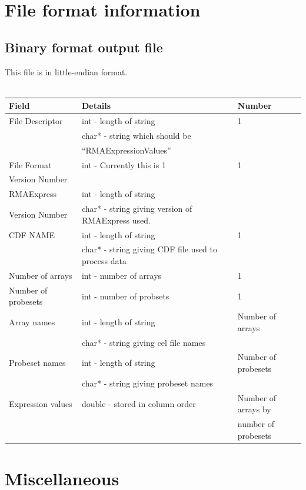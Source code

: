 \documentclass[11pt]{report}
\begin{document}
\chapter{File format information}


\section{Binary format output file}

This file is in little-endian format.
\\
\\
\begin{tabular}{|l|l|l|} \hline
Field & Details & Number \\ \hline
File Descriptor & int - length of string & 1 \\
&     char* - string which should be & \\
& ``RMAExpressionValues'' & \\ \hline
File Format &  int - Currently this is 1               & 1 \\
Version Number &   & \\ \hline 
RMAExpress & int - length of string & \\
Version Number & char* - string giving version of RMAExpress used.  & \\ \hline 
CDF NAME & int - length of string & 1 \\
& char* - string giving CDF file used to process data & \\ \hline
Number of arrays & int - number of arrays & 1 \\ \hline
Number of probesets & int - number of probsets & 1 \\ \hline
Array names & int - length of string & Number of arrays \\
& char* - string giving cel file names & \\ \hline
Probeset names &  int - length of string & Number of probesets \\
& char* - string giving probeset names & \\ \hline
Expression values & double - stored in column order & Number of arrays by\\
                  &                                 & number of probesets \\ \hline
\end{tabular}


\chapter{Miscellaneous}
\end{document}
